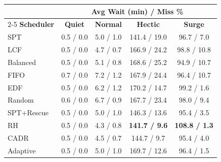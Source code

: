 \begingroup\setlength{\tabcolsep}{9pt}
\begin{tabular}{lcccc}
\toprule
& \multicolumn{4}{c}{\textbf{Avg Wait (min) / Miss \%}} \\
\cmidrule(lr){2-5}
\textbf{Scheduler} & \textbf{Quiet} & \textbf{Normal} & \textbf{Hectic} & \textbf{Surge} \\
\midrule
SPT & 0.5 / 0.0 & 5.0 / 1.0 & 141.4 / 19.0 & 96.7 / 7.0 \\
LCF & 0.5 / 0.0 & 4.7 / 0.7 & 166.9 / 24.2 & 98.8 / 10.8 \\
Balanced & 0.5 / 0.0 & 5.1 / 0.8 & 168.6 / 25.2 & 94.9 / 10.7 \\
FIFO & 0.7 / 0.0 & 7.2 / 1.2 & 167.9 / 24.4 & 96.4 / 10.7 \\
EDF & 0.5 / 0.0 & 6.2 / 1.2 & 170.2 / 14.7 & 99.2 / 1.6 \\
Random & 0.6 / 0.0 & 6.7 / 0.9 & 167.7 / 23.4 & 98.0 / 9.4 \\
SPT+Rescue & 0.5 / 0.0 & 5.0 / 1.0 & 146.3 / 13.6 & 95.4 / 3.5 \\
RH & 0.5 / 0.0 & 4.3 / 0.8 & \textbf{141.7 / 9.6} & \textbf{108.8 / 1.3} \\
CADR & 0.5 / 0.0 & 4.5 / 0.7 & 144.7 / 9.7 & 95.4 / 4.0 \\
Adaptive & 0.5 / 0.0 & 5.0 / 1.0 & 169.7 / 12.6 & 96.4 / 1.5 \\
\bottomrule
\end{tabular}
\endgroup
